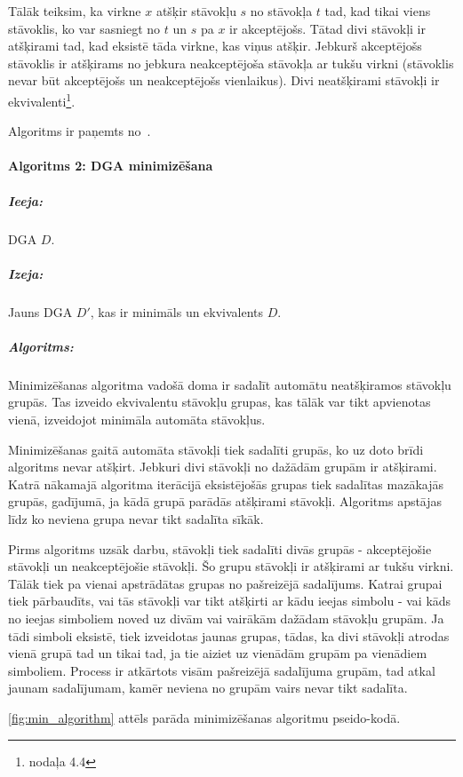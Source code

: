 Tālāk teiksim, ka virkne $x$ atšķir stāvokļu $s$ no stāvokļa $t$ tad, kad tikai viens stāvoklis, ko var sasniegt no $t$ un $s$ pa $x$ ir akceptējošs. Tātad divi stāvokļi ir atšķirami tad, kad eksistē tāda virkne, kas viņus atšķir. Jebkurš akceptējošs stāvoklis ir atšķirams no jebkura neakceptējoša stāvokļa ar tukšu virkni (stāvoklis nevar būt akceptējošs un neakceptējošs vienlaikus). Divi neatšķirami stāvokļi ir ekvivalenti\footnote{\cite{Hopcroft:IntroAutomataTheory} nodaļa 4.4}.

Algoritms ir paņemts no~\cite{DragonBook}.

\paragraph*{Algoritms 2: DGA minimizēšana}
\subparagraph{Ieeja:}DGA $D$.
\subparagraph{Izeja:}Jauns DGA $D'$, kas ir minimāls un ekvivalents $D$.
\subparagraph{Algoritms:} 

Minimizēšanas algoritma vadošā doma ir sadalīt automātu neatšķiramos stāvokļu grupās. Tas izveido ekvivalentu stāvokļu grupas, kas tālāk var tikt apvienotas vienā, izveidojot minimāla automāta stāvokļus.

Minimizēšanas gaitā automāta stāvokļi tiek sadalīti grupās, ko uz doto brīdi algoritms nevar atšķirt. Jebkuri divi stāvokļi no dažādām grupām ir atšķirami. Katrā nākamajā algoritma iterācijā eksistējošās grupas tiek sadalītas mazākajās grupās, gadījumā, ja kādā grupā parādās atšķirami stāvokļi. Algoritms apstājas līdz ko neviena grupa nevar tikt sadalīta sīkāk.

Pirms algoritms uzsāk darbu, stāvokļi tiek sadalīti divās grupās - akceptējošie stāvokļi un neakceptējošie stāvokļi. Šo grupu stāvokļi ir atšķirami ar tukšu virkni. Tālāk tiek pa vienai apstrādātas grupas no pašreizējā sadalījums. Katrai grupai tiek pārbaudīts, vai tās stāvokļi var tikt atšķirti ar kādu ieejas simbolu - vai kāds no ieejas simboliem noved uz divām vai vairākām dažādam stāvokļu grupām. Ja tādi simboli eksistē, tiek izveidotas jaunas grupas, tādas, ka divi stāvokļi atrodas vienā grupā tad un tikai tad, ja tie aiziet uz vienādām grupām pa vienādiem simboliem. Process ir atkārtots visām pašreizējā sadalījuma grupām, tad atkal jaunam sadalījumam, kamēr neviena no grupām vairs nevar tikt sadalīta.

\ref{fig:min_algorithm} attēls parāda minimizēšanas algoritmu pseido-kodā.

